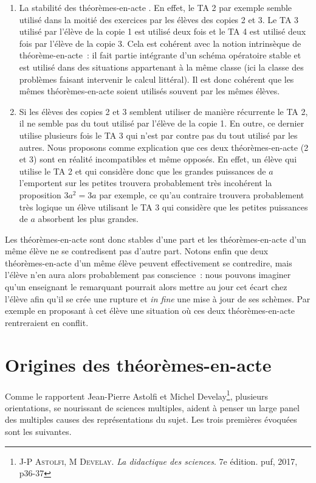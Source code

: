 \documentclass{report}
\theoremstyle{definition}
\newcommand{\tas}{théorèmes-en-acte }
\begin{document}
\begin{enumerate}
    \item La stabilité des \tas. En effet, le TA 2 par exemple semble utilisé dans la moitié des exercices par les élèves des copies 2 et 3. Le TA 3 utilisé par l'élève de la copie 1 est utilisé deux fois et le TA 4 est utilisé deux fois par l'élève de la copie 3. Cela est cohérent avec la notion intrinsèque de théorème-en-acte~: il fait partie intégrante d'un schéma opératoire stable et est utilisé dans des situations appartenant à la même classe (ici la classe des problèmes faisant intervenir le calcul littéral). Il est donc cohérent que les mêmes théorèmes-en-acte soient utilisés souvent par les mêmes élèves.
    \item Si les élèves des copies 2 et 3 semblent utiliser de manière récurrente le TA 2, il ne semble pas du tout utilisé par l'élève de la copie 1. En outre, ce dernier utilise plusieurs fois le TA 3 qui n'est par contre pas du tout utilisé par les autres. Nous proposons comme explication que ces deux théorèmes-en-acte (2 et 3) sont en réalité incompatibles et même opposés. En effet, un élève qui utilise le TA 2 et qui considère donc que les grandes puissances de $a$ l'emportent sur les petites trouvera probablement très incohérent la proposition $3a^2 = 3a$ par exemple, ce qu'au contraire trouvera probablement très logique un élève utilisant le TA 3 qui considère que les petites puissances de $a$ absorbent les plus grandes.
\end{enumerate}

Les théorèmes-en-acte sont donc stables d'une part et les théorèmes-en-acte d'un même élève ne se contredisent pas d'autre part. Notons enfin que deux théorèmes-en-acte d'un même élève peuvent effectivement se contredire, mais l'élève n'en aura alors probablement pas conscience~: nous pouvons imaginer qu'un enseignant le remarquant pourrait alors mettre au jour cet écart chez l'élève afin qu'il se crée une rupture et \textit{in fine} une mise à jour de ses schèmes. Par exemple en proposant à cet élève une situation où ces deux \tas rentreraient en conflit.

\section*{Origines des \tas}

Comme le rapportent Jean-Pierre Astolfi et Michel Develay\footnote{\textsc{J-P Astolfi, M Develay}. \textit{La didactique des sciences}. 7e édition. puf, 2017, p36-37}, plusieurs orientations, se nourissant de sciences multiples, aident à penser un large panel des multiples causes des représentations du sujet. Les trois premières évoquées sont les suivantes.
\end{document}

